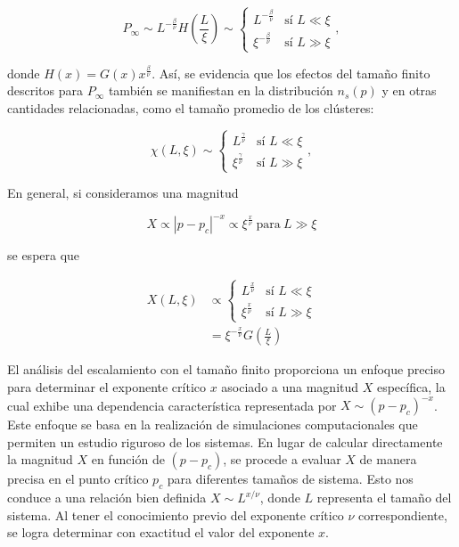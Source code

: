 \begin{equation}\label{eq:32}
	P_\infty\sim L^{-\frac{\beta}{\nu}}H\left(\frac{L}{\xi}\right) \sim \begin{cases}
		L^{-\frac{\beta}{\nu}} & \text{sí } L\ll \xi\\
		\xi^{-\frac{\beta}{\nu}}& \text{sí } L\gg\xi
	\end{cases},
\end{equation}

donde $H(x)=G(x)x^{\frac{\beta}{\nu}}$.  Así, se evidencia que los efectos del tamaño finito descritos para $P_\infty$ también se manifiestan en la distribución $n_s(p)$ y en otras cantidades relacionadas, como el tamaño promedio de los clústeres:


\begin{equation}\label{eq:33}
	\chi(L,\xi) \sim \begin{cases}
		L^{\frac{\gamma}{\nu}} & \text{sí } L\ll \xi\\
		\xi^{\frac{\gamma}{\nu}}& \text{sí } L\gg\xi
	\end{cases},
\end{equation}
	
En general, si consideramos una magnitud

\begin{equation}\label{eq:34}
X\propto\left|p-p_c \right|^{-x} \propto \xi^{\frac{x}{\nu}} \ \text{para} \ L\gg\xi
\end{equation}

se espera que

\begin{align}
	X(L,\xi) &\propto \begin{cases}
		L^{\frac{x}{\nu}} & \text{sí } L\ll \xi\\
		\xi^{\frac{x}{\nu}}& \text{sí } L\gg\xi
	\end{cases}\\
	&= \xi^{-\frac{x}{\nu}}G\left(\frac{L}{\xi}\right)
\end{align}

El análisis del escalamiento con el tamaño finito proporciona un enfoque preciso para determinar el exponente crítico $x$ asociado a una magnitud $X$ específica, la cual exhibe una dependencia característica representada por $X \sim (p - p_c)^{-x}$. Este enfoque se basa en la realización de simulaciones computacionales que permiten un estudio riguroso de los sistemas. En lugar de calcular directamente la magnitud $X$ en función de $(p - p_c)$, se procede a evaluar $X$ de manera precisa en el punto crítico $p_c$ para diferentes tamaños de sistema. Esto nos conduce a una relación bien definida $X\sim L^{x/\nu}$, donde $L$ representa el tamaño del sistema. Al tener el conocimiento previo del exponente crítico $\nu$ correspondiente, se logra determinar con exactitud el valor del exponente $x$. 



